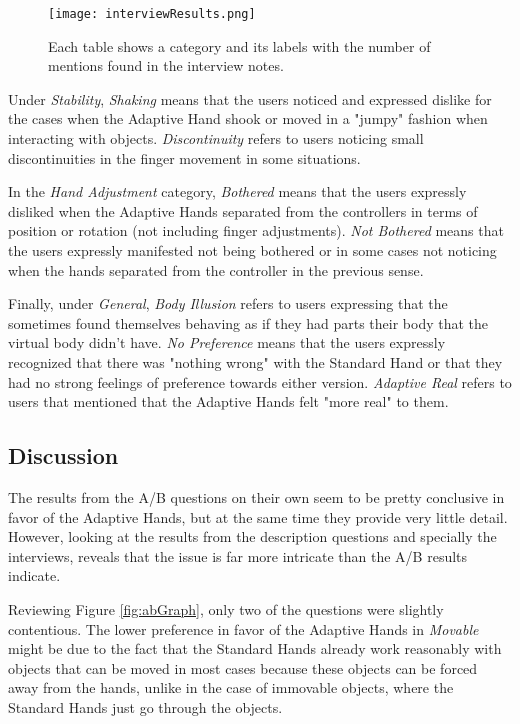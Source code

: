 \begin{figure}[H]
\centering
\texttt{[image: interviewResults.png]}
\caption{Each table shows a category and its labels with the number of mentions found in the interview notes.}
\label{fig:interviewResults}
\end{figure}

Under \textit{Stability}, \textit{Shaking} means that the users noticed and expressed dislike for the cases when the Adaptive Hand shook or moved in a "jumpy" fashion when interacting with objects. \textit{Discontinuity} refers to users noticing small discontinuities in the finger movement in some situations.

In the \textit{Hand Adjustment} category, \textit{Bothered} means that the users expressly disliked when the Adaptive Hands separated from the controllers in terms of position or rotation (not including finger adjustments). \textit{Not Bothered} means that the users expressly manifested not being bothered or in some cases not noticing when the hands separated from the controller in the previous sense.

Finally, under \textit{General}, \textit{Body Illusion} refers to users expressing that the sometimes found themselves behaving as if they had parts their body that the virtual body didn't have. \textit{No Preference} means that the users expressly recognized that there was "nothing wrong" with the Standard Hand or that they had no strong feelings of preference towards either version. \textit{Adaptive Real} refers to users that mentioned that the Adaptive Hands felt "more real" to them.

\subsection{Discussion}
\label{subsec:discussion}

The results from the A/B questions on their own seem to be pretty conclusive in favor of the Adaptive Hands, but at the same time they provide very little detail. However, looking at the results from the description questions and specially the interviews, reveals that the issue is far more intricate than the A/B results indicate.

Reviewing Figure \ref{fig:abGraph}, only two of the questions were slightly contentious. The lower preference in favor of the Adaptive Hands in \textit{Movable} might be due to the fact that the Standard Hands already work reasonably with objects that can be moved in most cases because these objects can be forced away from the hands, unlike in the case of immovable objects, where the Standard Hands just go through the objects.

